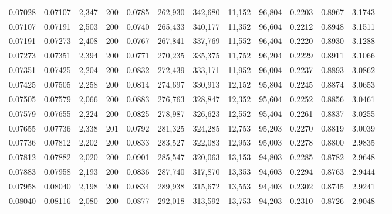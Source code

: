 \begin{tabular}{rrrrrrrrrrrrr}
0.07028 & 0.07107 &  2,347 & 200 &                                     0.0785 & 262,930 & 342,680 &  11,152 &  96,804 & 0.2203 & 0.8967 & 3.1743 \\
0.07107 & 0.07191 &  2,503 & 200 &                                     0.0740 & 265,433 & 340,177 &  11,352 &  96,604 & 0.2212 & 0.8948 & 3.1511 \\
0.07191 & 0.07273 &  2,408 & 200 &                                     0.0767 & 267,841 & 337,769 &  11,552 &  96,404 & 0.2220 & 0.8930 & 3.1288 \\
0.07273 & 0.07351 &  2,394 & 200 &                                     0.0771 & 270,235 & 335,375 &  11,752 &  96,204 & 0.2229 & 0.8911 & 3.1066 \\
0.07351 & 0.07425 &  2,204 & 200 &                                     0.0832 & 272,439 & 333,171 &  11,952 &  96,004 & 0.2237 & 0.8893 & 3.0862 \\
0.07425 & 0.07505 &  2,258 & 200 &                                     0.0814 & 274,697 & 330,913 &  12,152 &  95,804 & 0.2245 & 0.8874 & 3.0653 \\
0.07505 & 0.07579 &  2,066 & 200 &                                     0.0883 & 276,763 & 328,847 &  12,352 &  95,604 & 0.2252 & 0.8856 & 3.0461 \\
0.07579 & 0.07655 &  2,224 & 200 &                                     0.0825 & 278,987 & 326,623 &  12,552 &  95,404 & 0.2261 & 0.8837 & 3.0255 \\
0.07655 & 0.07736 &  2,338 & 201 &                                     0.0792 & 281,325 & 324,285 &  12,753 &  95,203 & 0.2270 & 0.8819 & 3.0039 \\
0.07736 & 0.07812 &  2,202 & 200 &                                     0.0833 & 283,527 & 322,083 &  12,953 &  95,003 & 0.2278 & 0.8800 & 2.9835 \\
0.07812 & 0.07882 &  2,020 & 200 &                                     0.0901 & 285,547 & 320,063 &  13,153 &  94,803 & 0.2285 & 0.8782 & 2.9648 \\
0.07883 & 0.07958 &  2,193 & 200 &                                     0.0836 & 287,740 & 317,870 &  13,353 &  94,603 & 0.2294 & 0.8763 & 2.9444 \\
0.07958 & 0.08040 &  2,198 & 200 &                                     0.0834 & 289,938 & 315,672 &  13,553 &  94,403 & 0.2302 & 0.8745 & 2.9241 \\
0.08040 & 0.08116 &  2,080 & 200 &                                     0.0877 & 292,018 & 313,592 &  13,753 &  94,203 & 0.2310 & 0.8726 & 2.9048 \\

\end{tabular}
